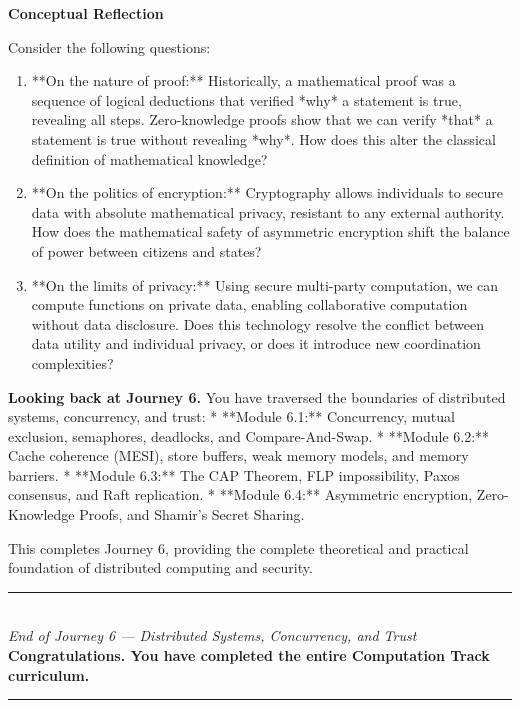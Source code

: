 \documentclass[12pt, a4paper]{book}
\begin{document}
\begin{reflectionbox}
\textbf{Conceptual Reflection}

Consider the following questions:
\begin{enumerate}
  \item **On the nature of proof:** Historically, a mathematical proof was a sequence of logical deductions that verified *why* a statement is true, revealing all steps. Zero-knowledge proofs show that we can verify *that* a statement is true without revealing *why*. How does this alter the classical definition of mathematical knowledge?
  \item **On the politics of encryption:** Cryptography allows individuals to secure data with absolute mathematical privacy, resistant to any external authority. How does the mathematical safety of asymmetric encryption shift the balance of power between citizens and states?
  \item **On the limits of privacy:** Using secure multi-party computation, we can compute functions on private data, enabling collaborative computation without data disclosure. Does this technology resolve the conflict between data utility and individual privacy, or does it introduce new coordination complexities?
\end{enumerate}
\end{reflectionbox}

\medskip
\noindent\textbf{Looking back at Journey 6.}
You have traversed the boundaries of distributed systems, concurrency, and trust:
* **Module 6.1:** Concurrency, mutual exclusion, semaphores, deadlocks, and Compare-And-Swap.
* **Module 6.2:** Cache coherence (MESI), store buffers, weak memory models, and memory barriers.
* **Module 6.3:** The CAP Theorem, FLP impossibility, Paxos consensus, and Raft replication.
* **Module 6.4:** Asymmetric encryption, Zero-Knowledge Proofs, and Shamir's Secret Sharing.

This completes Journey 6, providing the complete theoretical and practical foundation of distributed computing and security.

\vspace{1.4cm}
\begin{center}
{\color{JourneyColor}\rule{0.5\linewidth}{0.8pt}}\\[6pt]
{\small\color{JourneyColor}\textit{End of Journey 6 --- Distributed Systems, Concurrency, and Trust}}\\[4pt]
{\small\color{JourneyColor}\textbf{Congratulations. You have completed the entire Computation Track curriculum.}}\\[6pt]
{\color{JourneyColor}\rule{0.5\linewidth}{0.8pt}}
\end{center}
\end{document}
